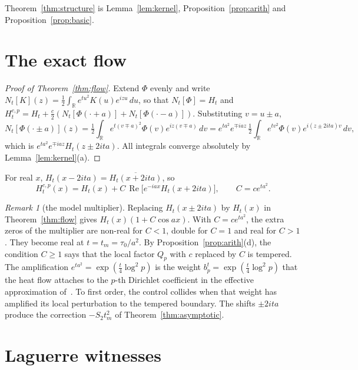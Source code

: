 \documentclass[11pt]{article}
\numberwithin{equation}{section}
\theoremstyle{definition}
\theoremstyle{remark}
\newtheorem{remark}[theorem]{Remark}
\DeclareMathOperator{\Rea}{Re}
\newcommand{\dd}{\,d}
\begin{document}
Theorem~\ref{thm:structure} is Lemma~\ref{lem:kernel},
Proposition~\ref{prop:arith} and Proposition~\ref{prop:basic}.

\section{The exact flow}\label{sec:flow}

\begin{proof}[Proof of Theorem~\ref{thm:flow}]
Extend $\Phi$ evenly and write
$N_t[K](z)=\tfrac12\int_{\mathbb R}e^{tu^2}K(u)e^{izu}\dd u$, so that
$N_t[\Phi]=H_t$ and $H^{c,p}_t=H_t+\tfrac c2(N_t[\Phi(\cdot+a)]
+N_t[\Phi(\cdot-a)])$. Substituting $v=u\pm a$,
\[
N_t[\Phi(\cdot\pm a)](z)
=\tfrac12\int_{\mathbb R}e^{t(v\mp a)^2}\Phi(v)e^{iz(v\mp a)}\dd v
=e^{ta^2}e^{\mp iaz}\,\tfrac12\int_{\mathbb R}e^{tv^2}\Phi(v)
e^{i(z\pm2ita)v}\dd v ,
\]
which is $e^{ta^2}e^{\mp iaz}H_t(z\pm2ita)$. All integrals converge
absolutely by Lemma~\ref{lem:kernel}(a).
\end{proof}

For real $x$, $H_t(x-2ita)=\overline{H_t(x+2ita)}$, so
\begin{equation}\label{eq:flowreal}
H^{c,p}_t(x)=H_t(x)+C\,\Rea\bigl[e^{-iax}H_t(x+2ita)\bigr],\qquad
C=ce^{ta^2}.
\end{equation}

\begin{remark}[the model multiplier]\label{rem:model}
Replacing $H_t(x\pm2ita)$ by $H_t(x)$ in Theorem~\ref{thm:flow} gives
$H_t(x)(1+C\cos ax)$. With $C=ce^{ta^2}$, the extra zeros of the multiplier
are non-real for $C<1$, double for $C=1$ and real for $C>1$. They become real
at $t=t_m=\tau_0/a^2$. By Proposition~\ref{prop:arith}(d), the condition
$C\ge1$ says that the local factor $Q_p$ with $c$ replaced by $C$ is
tempered. The amplification $e^{ta^2}=\exp(\tfrac t4\log^2p)$ is the weight
$b_p^t=\exp(\tfrac t4\log^2p)$ that the heat flow attaches to the $p$-th
Dirichlet coefficient in the effective approximation of~\cite{polymath}. To
first order, the control collides when that weight has amplified its local
perturbation to the tempered boundary. The shifts $\pm2ita$ produce the
correction $-S_2t_m^2$ of Theorem~\ref{thm:asymptotic}.
\end{remark}

\section{Laguerre witnesses}\label{sec:witness}
\end{document}
